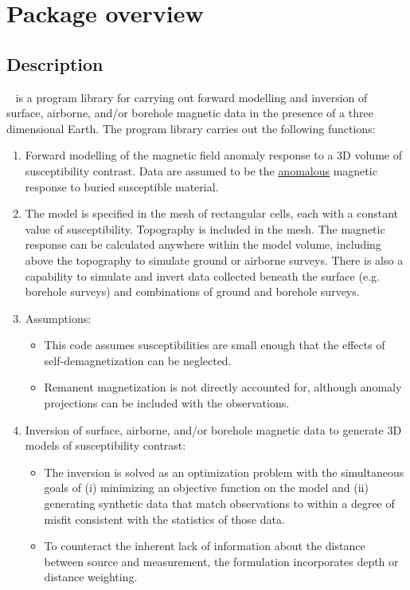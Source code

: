 \section{Package overview}
\subsection{Description}
\prog~ is a program library for carrying out forward modelling and inversion of surface, airborne, and/or borehole magnetic data in the presence of a three dimensional Earth. The program library carries out the following functions:

\begin{enumerate}
\item Forward modelling of the magnetic field anomaly response to a 3D volume of susceptibility contrast. Data are assumed to be the \underline{anomalous} magnetic response to buried susceptible material.
\item The model is specified in the mesh of rectangular cells, each with a constant value of susceptibility. Topography is included in the mesh. The magnetic response can be calculated anywhere within the model volume, including above the topography to simulate ground or airborne surveys. There is also a capability to simulate and invert data collected beneath the surface (e.g. borehole surveys) and combinations of ground and borehole surveys.
\item Assumptions:
\begin{itemize}
\item This code assumes susceptibilities are small enough that the effects of self-demagnetization can be neglected.
\item Remanent magnetization is not directly accounted for, although anomaly projections can be included with the observations.
\end{itemize}
\item Inversion of surface, airborne, and/or borehole magnetic data to generate 3D models of susceptibility contrast:
\begin{itemize}
\item The inversion is solved as an optimization problem with the simultaneous goals of (i) minimizing an objective function on the model and (ii) generating synthetic data that match observations to within a degree of misfit consistent with the statistics of those data.
\item To counteract the inherent lack of information about the distance between source and measurement, the formulation incorporates depth or distance weighting.

\end{itemize}
\end{enumerate}

